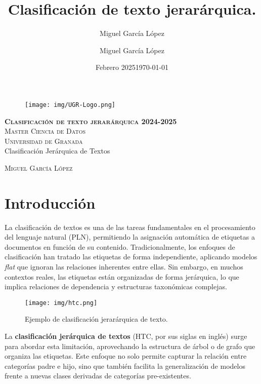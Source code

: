 \documentclass[12pt,letterpaper]{article}
\title{Clasificación de texto jerarárquica.}
\author{Miguel García López}
\date{Febrero 2025}
\author{Miguel García López} %
\date{\normalsize\today} %
\begin{document}
\begin{titlepage}
    \begin{figure}
        \vspace{-1.3cm}
        \begin{center}
            \texttt{[image: img/UGR-Logo.png]}
        \end{center}
    \end{figure}
    \vspace{1.3cm}
    \centering
    \normalfont \normalsize
    \textsc{\textbf{Clasificación de texto jerarárquica 2024-2025} \\ \vspace{.15cm} Master Ciencia de Datos\\ \vspace{.15cm} Universidad de Granada} \\ [25pt]
    \huge Clasificación Jerárquica de Textos

    \normalfont \normalsize \vspace{.30cm}
    \textsc{Miguel García López}

\end{titlepage}

\tableofcontents
\listoffigures
\listoftables
\newpage

\section{Introducción}
La clasificación de textos es una de las tareas fundamentales en el procesamiento del lenguaje natural (PLN), permitiendo la asignación automática de etiquetas a documentos en función de su contenido. Tradicionalmente, los enfoques de clasificación han tratado las etiquetas de forma independiente, aplicando modelos \textit{flat} que ignoran las relaciones inherentes entre ellas. Sin embargo, en muchos contextos reales, las etiquetas están organizadas de forma jerárquica, lo que implica relaciones de dependencia y estructuras taxonómicas complejas.

\begin{figure}[htp]
    \centering
    \texttt{[image: img/htc.png]}
    \caption{Ejemplo de clasificación jerarárquica de texto.}
    \label{fig:hierarchical_text_class}
\end{figure}

La \textbf{clasificación jerárquica de textos} (HTC, por sus siglas en inglés) surge para abordar esta limitación, aprovechando la estructura de árbol o de grafo que organiza las etiquetas. Este enfoque no solo permite capturar la relación entre categorías padre e hijo, sino que también facilita la generalización de modelos frente a nuevas clases derivadas de categorías pre-existentes.
\end{document}
